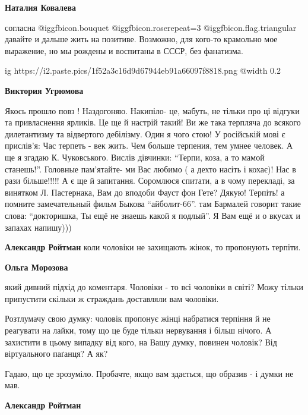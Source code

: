 \begin{itemize}
\begin{itemize} %
\textbf{Наталия Ковалева} 

согласна @igg{fbicon.bouquet}  @igg{fbicon.rose}{repeat=3}  @igg{fbicon.flag.triangular} давайте и дальше
жить на позитиве. Возможно, для кого-то крамольно мое выражение, но мы рождены
и воспитаны в СССР, без фанатизма.

\ifcmt
  ig https://i2.paste.pics/1f52a3c16d9d67944eb91a66097f8818.png
  @width 0.2
\fi

\end{itemize} %

\textbf{Виктория Угрюмова}

\obeycr
Якось прошло повз ! Наздогоняю.
Накипіло- це, мабуть, не тільки про ці відгуки та привласнення ярликів. Це ще й настрій такий!
Ви же така терпляча до всякого дилетантизму та відвертого дебілізму. Один я чого стою!
У російській мові є прислів'я:
Час терпеть - век жить.
Чем больше терпения, тем умнее человек.
А ще я згадаю К. Чуковського. Вислів дівчинки:
\enquote{Терпи, коза, а то мамой станешь!}.
Головные пам'ятайте- ми Вас любимо ( а дехто насіть і кохає)! Нас в рази більше!!!!!
А є ще й запитання.
Соромлюся спитати, а в чому перекладі, за винятком Л. Пастернака, Вам до вподоби Фауст фон Гете?
Дякую!
Терпіть!
а помните замечательный фильм Быкова \enquote{айболит-66}.
там Бармалей говорит такие слова: \enquote{докторишка, Ты ещё не знаешь какой я подлый}.
Я Вам ещё и о вкусах и запахах напишу)))
\restorecr

\begin{itemize} %
\textbf{Александр Ройтман} коли чоловіки не захищають жінок, то пропонують терпіти.

\begin{itemize} %
\textbf{Ольга Морозова} 

який дивний підхід до коментаря. Чоловіки - то всі чоловіки в світі? Можу
тільки припустити скільки ж страждань доставляли вам чоловіки.

Розтлумачу свою думку: чоловік пропонує жінці набратися терпіння й не реагувати
на лайки, тому що це буде тільки нервування і більш нічого. А захистити в цьому
випадку від кого, на Вашу думку, повинен чоловік? Від віртуального паґанця? А
як?

Гадаю, що це зрозуміло. Пробачте, якщо вам здається, що образив - і думки не
мав.

\textbf{Александр Ройтман} 


\end{itemize}
\end{itemize}
\end{itemize}
